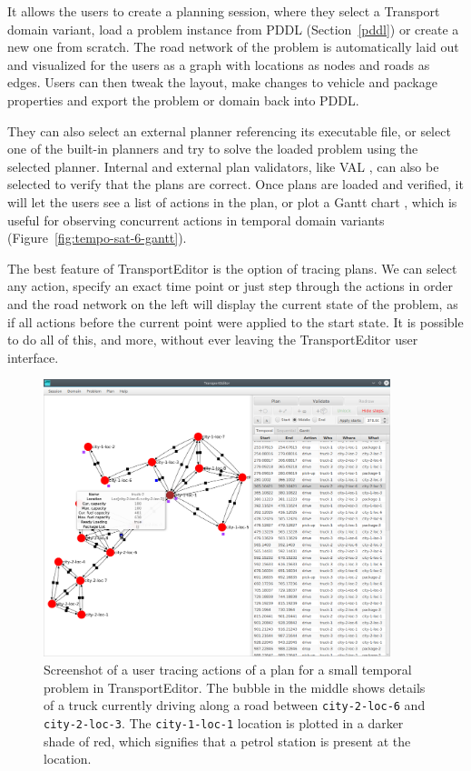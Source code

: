 It allows the users to create a planning session, where they
select a Transport domain variant, load a problem instance from PDDL (Section~\ref{pddl}) or create a new one from scratch.
The road network of the problem is automatically laid out and visualized for the users as a graph with locations as nodes and roads as edges.
Users can then tweak the layout, make changes to vehicle and package properties
and export the problem or domain back into PDDL.

They can also select an external planner
referencing its executable file, or select one of the built-in planners and try to solve
the loaded problem using the selected planner. Internal and external plan validators, like VAL \citep{Howey2003}, can also be selected to verify that the plans are correct.
Once plans are loaded and verified, it will let the users see a list of actions
in the plan, or plot a Gantt chart \citep{Gantt1910}, which is useful for observing concurrent actions in temporal domain variants (Figure~\ref{fig:tempo-sat-6-gantt}).

The best feature of TransportEditor is the option of tracing plans. We can select
any action, specify an exact time point or just step through the actions in order and
the road network on the left will display the current state of the problem, as if
all actions before the current point were applied to the start state.
It is possible to do all of this, and more, without ever leaving the TransportEditor user interface.

\begin{figure}[t]
\begin{center}
\includegraphics[width=0.9\textwidth]{../img/transporteditor_temporal}
\end{center}
\caption*%
{Screenshot of a user tracing actions of a plan for a small temporal problem in TransportEditor. The bubble in the middle shows details
of a truck currently driving along a road between \texttt{city-2-loc-6} and \texttt{city-2-loc-3}. The \texttt{city-1-loc-1} location is plotted in a darker shade of red, which signifies that a petrol station is present at the location.}
\end{figure}

